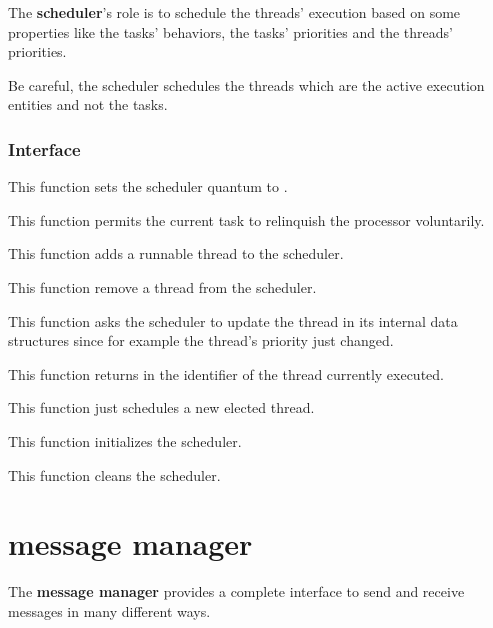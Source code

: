 The \textbf{scheduler}'s role is to schedule the threads' execution
based on some properties like the tasks' behaviors, the tasks' priorities
and the threads' priorities.

Be careful, the scheduler schedules the threads which are the active
execution entities and not the tasks.


%
%

\subsubsection{Interface}

	 {
	   This function sets the scheduler quantum to .
	 }

	 {
	   This function permits the current task to relinquish
	   the processor voluntarily.
	 }

	 {
	   This function adds a runnable thread to the scheduler.
	 }

	 {
	   This function remove a thread from the scheduler.
	 }

	 {
	   This function asks the scheduler to update the thread
	    in its internal data structures since
	   for example the thread's priority just changed.
	 }

	 {
	   This function returns in  the identifier
	   of the thread currently executed.
	 }

	 {
	   This function just schedules a new elected thread.
	 }

	 {
	   This function initializes the scheduler.
	 }

	 {
	   This function cleans the scheduler.
	 }

%
%

\section{message manager}

The \textbf{message manager} provides a complete interface to send and
receive messages in many different ways.

